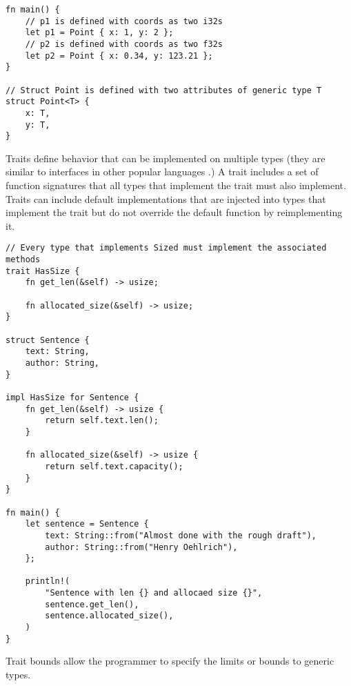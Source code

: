 \documentclass[12pt]{article}
\begin{document}
\begin{flushleft}
\singlespacing{}
\begin{verbatim}
fn main() {
    // p1 is defined with coords as two i32s
    let p1 = Point { x: 1, y: 2 };
    // p2 is defined with coords as two f32s
    let p2 = Point { x: 0.34, y: 123.21 };
}

// Struct Point is defined with two attributes of generic type T
struct Point<T> {
    x: T,
    y: T,
}
\end{verbatim}
\doublespacing{}

Traits define behavior that can be implemented on multiple types (they are
similar to interfaces in other popular languages \cite{rustbook}.) A trait
includes a set of function signatures that all types that implement the trait
must also implement. Traits can include default implementations that are
injected into types that implement the trait but do not override the default
function by reimplementing it.

\singlespacing{}
\begin{verbatim}
// Every type that implements Sized must implement the associated methods
trait HasSize {
    fn get_len(&self) -> usize;

    fn allocated_size(&self) -> usize;
}

struct Sentence {
    text: String,
    author: String,
}

impl HasSize for Sentence {
    fn get_len(&self) -> usize {
        return self.text.len();
    }

    fn allocated_size(&self) -> usize {
        return self.text.capacity();
    }
}

fn main() {
    let sentence = Sentence {
        text: String::from("Almost done with the rough draft"),
        author: String::from("Henry Oehlrich"),
    };

    println!(
        "Sentence with len {} and allocaed size {}",
        sentence.get_len(),
        sentence.allocated_size(),
    )
}
\end{verbatim}
\doublespacing{}

Trait bounds allow the programmer to specify the limits or bounds to generic
types. 

\cite{rustforrustaceans} \\
\cite{rust-lang.org} \\
\cite{rust-by-example} \\
\cite{the-c-programming-language} \\
\cite{noboilerplate}


 

\end{flushleft}
\end{document}
